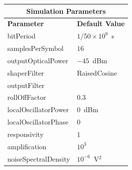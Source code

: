 \begin{table}[H]
	\centering
	\footnotesize
	\begin{tabular}{|l|l|}
		\hline
		\multicolumn{2}{|c|}{ \textbf{Simulation Parameters} } \\
		\hline
		\textbf{Parameter}     & \textbf{Default Value}                                     \\\hline
		bitPeriod              & $1/50\times10^9$~s														\\\hline
		samplesPerSymbol       & $16$                                                       \\\hline
		outputOpticalPower     & $-45$~dBm 													\\ \hline
		shaperFilter	       & RaisedCosine												\\ \hline
		outputFilter		   &                     										\\ \hline
		rollOffFactor		   & 0.3														\\ \hline
		localOscillatorPower   & $0$~dBm                                                    \\ \hline
		localOscillatorPhase   & $0$                                                        \\ \hline
		responsivity           & $1$                                                        \\ \hline
		amplification          & $10^3$                                                     \\ \hline
		noiseSpectralDensity   & $10^{-6}$~V$^2$                             					\\ \hline
	\end{tabular}
\end{table}
